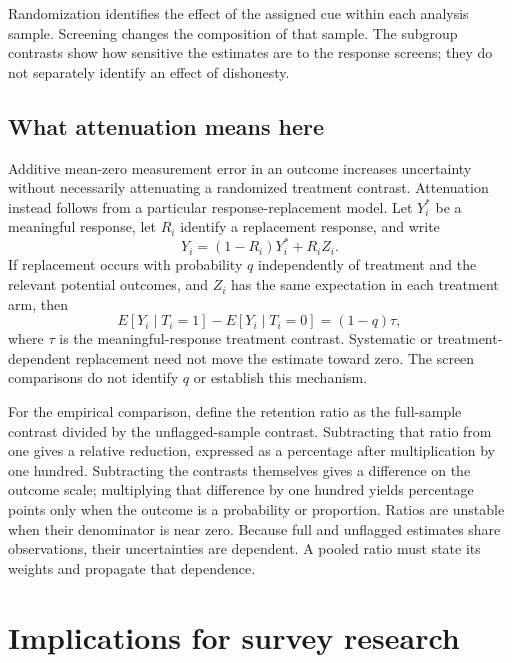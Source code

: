 \documentclass[11pt]{article}
\begin{document}
Randomization identifies the effect of the assigned cue within each analysis sample. Screening changes the composition of that sample. The subgroup contrasts show how sensitive the estimates are to the response screens; they do not separately identify an effect of dishonesty.

\subsection{What attenuation means here}

Additive mean-zero measurement error in an outcome increases uncertainty without necessarily attenuating a randomized treatment contrast. Attenuation instead follows from a particular response-replacement model. Let $Y_i^*$ be a meaningful response, let $R_i$ identify a replacement response, and write
\begin{equation}
Y_i=(1-R_i)Y_i^*+R_i Z_i.
\end{equation}
If replacement occurs with probability $q$ independently of treatment and the relevant potential outcomes, and $Z_i$ has the same expectation in each treatment arm, then
\begin{equation}
E[Y_i\mid T_i=1]-E[Y_i\mid T_i=0]=(1-q)\tau,
\end{equation}
where $\tau$ is the meaningful-response treatment contrast. Systematic or treatment-dependent replacement need not move the estimate toward zero. The screen comparisons do not identify $q$ or establish this mechanism.

For the empirical comparison, define the retention ratio as the full-sample contrast divided by the unflagged-sample contrast. Subtracting that ratio from one gives a relative reduction, expressed as a percentage after multiplication by one hundred. Subtracting the contrasts themselves gives a difference on the outcome scale; multiplying that difference by one hundred yields percentage points only when the outcome is a probability or proportion. Ratios are unstable when their denominator is near zero. Because full and unflagged estimates share observations, their uncertainties are dependent. A pooled ratio must state its weights and propagate that dependence.



\section{Implications for survey research}
\end{document}
